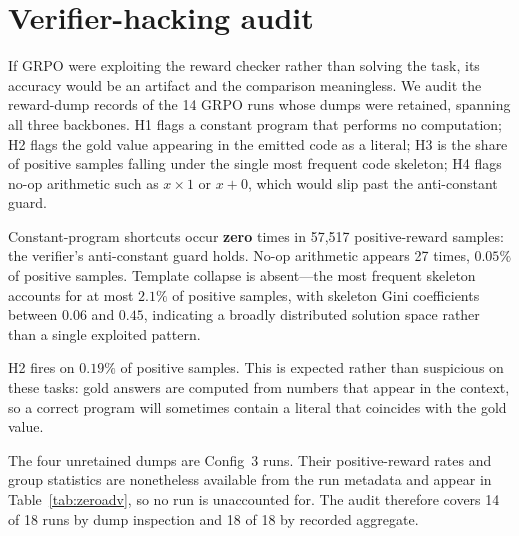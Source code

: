\section{Verifier-hacking audit}
\label{app:hacking}

If GRPO were exploiting the reward checker rather than solving the task, its
accuracy would be an artifact and the comparison meaningless. We audit the
reward-dump records of the 14 GRPO runs whose dumps were retained, spanning all
three backbones. H1 flags a constant program that performs no computation; H2
flags the gold value appearing in the emitted code as a literal; H3 is the
share of positive samples falling under the single most frequent code skeleton;
H4 flags no-op arithmetic such as $x \times 1$ or $x + 0$, which would slip past
the anti-constant guard.



\noindent
Constant-program shortcuts occur \textbf{zero} times in 57{,}517
positive-reward samples: the verifier's anti-constant guard holds. No-op
arithmetic appears 27 times, $0.05\%$ of positive samples. Template collapse is
absent---the most frequent skeleton accounts for at most $2.1\%$ of positive
samples, with skeleton Gini coefficients between $0.06$ and $0.45$, indicating
a broadly distributed solution space rather than a single exploited pattern.

H2 fires on $0.19\%$ of positive samples. This is expected rather than
suspicious on these tasks: gold answers are computed from numbers that appear
in the context, so a correct program will sometimes contain a literal that
coincides with the gold value.

The four unretained dumps are Config~3 runs. Their positive-reward rates and
group statistics are nonetheless available from the run metadata and appear in
Table~\ref{tab:zeroadv}, so no run is unaccounted for. The audit therefore
covers 14 of 18 runs by dump inspection and 18 of 18 by recorded aggregate.
